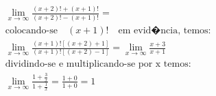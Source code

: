 \begin{ex}
\begin{align}
&\lim_{x\rightarrow \infty} \frac{(x+2)!+(x+1)!}{(x+2)!-(x+1)!}=\nonumber\\
&\text{colocando-se}\quad (x+1)!\quad\text{em evid�ncia, temos:}\nonumber\\
&\lim_{x\rightarrow \infty} \frac{(x+1)![(x+2)+1]}{(x+1)![(x+2)-1]}=\lim_{x\rightarrow \infty} \frac{x+3}{x+1}\nonumber\\
&\text{dividindo-se e multiplicando-se por x temos:}\nonumber\\
&\lim_{x\rightarrow \infty} \frac{1+\frac{3}{x}}{1+\frac{1}{x}}=\frac{1+0}{1+0}=1\nonumber
\end{align}
\end{ex}
